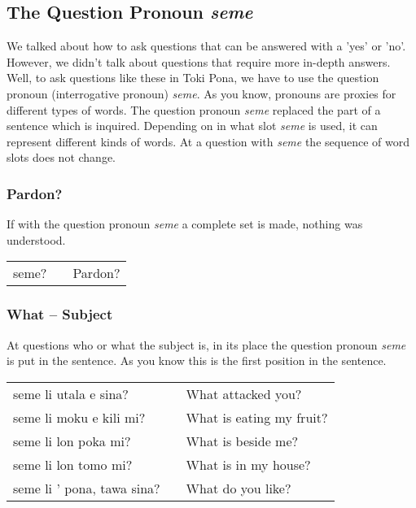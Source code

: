 \subsection*{The Question Pronoun \textit{seme}}
%
We talked about how to ask questions that can be answered with a 'yes' or 'no'. 
However, we didn't talk about questions that require more in-depth answers. 
Well, to ask questions like these in Toki Pona, we have to use the question pronoun (interrogative pronoun) \textit{seme}. 
As you know, pronouns are proxies for different types of words.
The question pronoun \textit{seme} replaced the part of a sentence which is inquired.
Depending on in what slot \textit{seme} is used, it can represent different kinds of words. 
At a question with \textit{seme} the sequence of word slots does not change. 
%
\subsubsection*{Pardon?}
%
If with the question pronoun \textit{seme} a complete set is made, nothing was understood. 

\begin{supertabular}{p{5,5cm}|ll}
seme? && Pardon? \\
\end{supertabular} 
%
\subsubsection*{What -- Subject}
%
At questions who or what the subject is, in its place the question pronoun \textit{seme} is put in the sentence.
As you know this is the first position in the sentence. 

\begin{supertabular}{p{5,5cm}|ll}
seme li utala e sina? && What attacked you? \\
seme li moku e kili mi? && What is eating my fruit? \\
seme li lon poka mi? && What is beside me? \\
seme li lon tomo mi? && What is in my house? \\
seme li ' pona, tawa sina? && What do you like? \\ 
\end{supertabular} 
%
